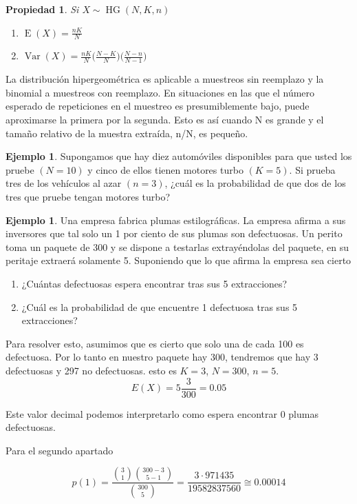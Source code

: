 \documentclass[]{book}
\theoremstyle{plain}
\newtheorem{property}[theorem]{Propiedad}
\theoremstyle{definition}
\newtheorem{example}[theorem]{Ejemplo}
\theoremstyle{definition} %
\begin{document}
\begin{property}

  Si \(\displaystyle X\sim \operatorname {HG} (N,K,n)\)  
\begin{enumerate}
  \item $\displaystyle \operatorname {E} (X)={\frac {nK}{N}}$
  \item $\displaystyle \operatorname {Var} (X)={\frac {nK}{N}}{\bigg (}{\frac {N-K}{N}}{\bigg )}{\bigg (}{\frac {N-n}{N-1}}{\bigg )}$
\end{enumerate}
\end{property}
 
La distribución hipergeométrica es aplicable a muestreos sin reemplazo y
la binomial a muestreos con reemplazo. En situaciones en las que el
número esperado de repeticiones en el muestreo es presumiblemente bajo,
puede aproximarse la primera por la segunda. Esto es así cuando N es
grande y el tamaño relativo de la muestra extraída, n/N, es pequeño.

\begin{example}
Supongamos que hay diez automóviles disponibles para que usted los
pruebe \((N = 10)\) y cinco de ellos tienen motores turbo \((K = 5)\).
Si prueba tres de los vehículos al azar \((n = 3)\), ¿cuál es la
probabilidad de que dos de los tres que pruebe tengan motores turbo?
\end{example}

\begin{example}
 Una empresa fabrica plumas estilográficas. La empresa afirma a sus inversores que tal solo un 1 por ciento de 
 sus plumas son defectuosas. Un perito toma un paquete de 300 y se dispone a testarlas extrayéndolas del paquete, 
 en su peritaje extraerá solamente 5. Suponiendo que 
 lo que afirma la empresa sea cierto
 \begin{enumerate}
   \item ¿Cuántas defectuosas espera encontrar tras sus 5 extracciones?
   \item ¿Cuál es la probabilidad de que encuentre 1 defectuosa tras sus 5 extracciones?
 \end{enumerate}
 
 Para resolver esto, asumimos que es cierto que solo una de cada 100 es defectuosa. Por lo tanto en nuestro paquete hay 300, 
 tendremos que hay 3 defectuosas y 297 no defectuosas. esto es $K=3$, $N=300$, $n=5$.
 \[E(X) = 5 \frac{3}{300} = 0.05\]

 Este valor decimal podemos interpretarlo como espera encontrar 0 plumas defectuosas.

 Para el segundo apartado

 \[p(1) = \frac {{\binom {3}{1}}{\binom {300-3}{5-1}}}{\binom {300}{5}} = \frac{3 \cdot 971435}{19582837560} \cong 0.00014 \]
  
  \end{example}
 
\end{document}
